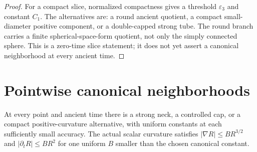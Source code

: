 \begin{proof}
For a compact slice, normalized compactness gives a threshold $\varepsilon_3$
and constant $C_1$.  The alternatives are: a round ancient quotient, a
compact small-diameter positive component, or a double-capped strong tube.
The round branch carries a finite spherical-space-form quotient, not only the
simply connected sphere.  This is a zero-time slice
statement; it does not yet assert a canonical neighborhood at every ancient
time.
\end{proof}

\section{Pointwise canonical neighborhoods}
\label{sec:m27}

\begin{theorem}
\label{thm:neck-cap-canonical}
At every point and ancient time there is a strong neck, a controlled cap,
or a compact positive-curvature alternative, with uniform constants at
each sufficiently small accuracy. The actual scalar curvature satisfies
$|\nabla R|\leq B R^{3/2}$ and $|\partial_t R|\leq B R^2$ for one
uniform $B$ smaller than the chosen canonical constant.
\end{theorem}


